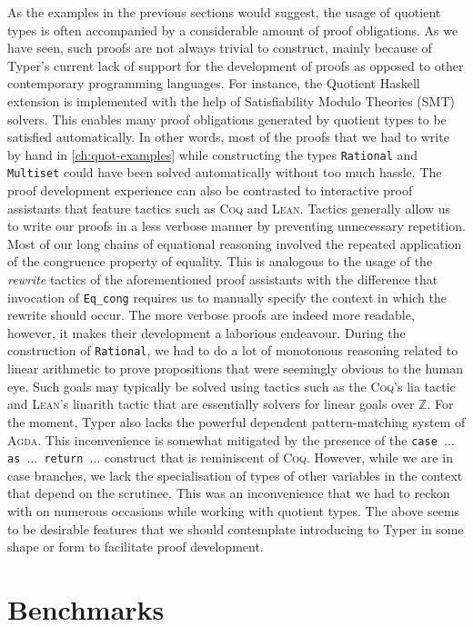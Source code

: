 \documentclass[12pt,twoside,maitrise]{dms}
\theoremstyle{definition}
\numberwithin{equation}{section}
\numberwithin{table}{chapter}
\numberwithin{figure}{chapter}
\newcommand\kw[1] {\textsf{#1}}
\newcommand\id[1] {\texttt{#1}}
\newcommand\fn[1] {\texttt{#1}}
\def\Coq{\textsc{Coq}\xspace}
\def\Agda{\textsc{Agda}\xspace}
\def\Lean{\textsc{Lean}\xspace}
\begin{document}
As the examples in the previous sections would suggest, the usage of quotient
types is often accompanied by a considerable amount of proof obligations. As we
have seen, such proofs are not always trivial to construct, mainly because of
Typer's current lack of support for the development of proofs as opposed to
other contemporary programming languages. For instance, the Quotient Haskell
extension\cite{hewer2023quotient} is implemented with the help of Satisfiability
Modulo Theories (SMT) solvers. This enables many proof obligations generated by
quotient types to be satisfied automatically. In other words, most of the proofs
that we had to write by hand in \autoref{ch:quot-examples} while constructing
the types \id{Rational} and \id{Multiset} could have been solved automatically
without too much hassle. The proof development experience can also be contrasted
to interactive proof assistants that feature tactics such as \Coq{} and \Lean{}.
Tactics generally allow us to write our proofs in a less verbose manner by
preventing unnecessary repetition. Most of our long chains of equational
reasoning involved the repeated application of the congruence property of
equality. This is analogous to the usage of the \emph{rewrite} tactics of the
aforementioned proof assistants with the difference that invocation of
\id{Eq\_cong} requires us to manually specify the context in which the rewrite
should occur. The more verbose proofs are indeed more readable, however, it makes
their development a laborious endeavour. During the construction of
\id{Rational}, we had to do a lot of monotonous reasoning related to linear
arithmetic to prove propositions that were seemingly obvious to the
human eye. Such goals may typically be solved using tactics such as the \Coq{}'s
\kw{lia} tactic and \Lean{}'s \kw{linarith} tactic that are essentially solvers
for linear goals over $\mathbb{Z}$. For the moment, Typer also lacks the
powerful dependent pattern-matching system of \Agda{}. This inconvenience is
somewhat mitigated by the presence of the \fn{\kw{case} $\ldots$ \kw{as}
  $\ldots$ \kw{return} $\ldots$} construct that is reminiscent of \Coq{}.
However, while we are in \kw{case} branches, we lack the specialisation of types
of other variables in the context that depend on the scrutinee. This was an
inconvenience that we had to reckon with on numerous occasions while working
with quotient types. The above seems to be desirable features that we should
contemplate introducing to Typer in some shape or form to facilitate proof
development.

\section*{Benchmarks}\label{sec:quot-benchmark}
\end{document}
